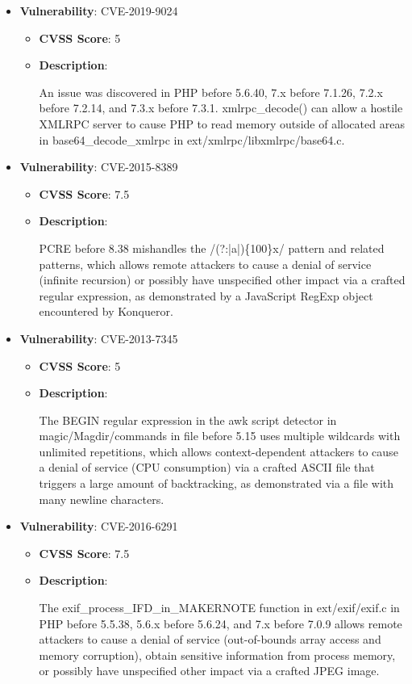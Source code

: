 \documentclass{article}
\begin{document}
\begin{itemize}
        \item \textbf{Vulnerability}: CVE-2019-9024
        \begin{itemize}
            \item \textbf{CVSS Score}:  5 
            \item \textbf{Description}:
            \parbox[t]{0.9\linewidth}{
                \ttfamily An issue was discovered in PHP before 5.6.40, 7.x before 7.1.26, 7.2.x before 7.2.14, and 7.3.x before 7.3.1. xmlrpc\_decode() can allow a hostile XMLRPC server to cause PHP to read memory outside of allocated areas in base64\_decode\_xmlrpc in ext/xmlrpc/libxmlrpc/base64.c.
            }
        \end{itemize}
    
        \item \textbf{Vulnerability}: CVE-2015-8389
        \begin{itemize}
            \item \textbf{CVSS Score}:  7.5 
            \item \textbf{Description}:
            \parbox[t]{0.9\linewidth}{
                \ttfamily PCRE before 8.38 mishandles the /(?:|a|)\{100\}x/ pattern and related patterns, which allows remote attackers to cause a denial of service (infinite recursion) or possibly have unspecified other impact via a crafted regular expression, as demonstrated by a JavaScript RegExp object encountered by Konqueror.
            }
        \end{itemize}
    
        \item \textbf{Vulnerability}: CVE-2013-7345
        \begin{itemize}
            \item \textbf{CVSS Score}:  5 
            \item \textbf{Description}:
            \parbox[t]{0.9\linewidth}{
                \ttfamily The BEGIN regular expression in the awk script detector in magic/Magdir/commands in file before 5.15 uses multiple wildcards with unlimited repetitions, which allows context-dependent attackers to cause a denial of service (CPU consumption) via a crafted ASCII file that triggers a large amount of backtracking, as demonstrated via a file with many newline characters.
            }
        \end{itemize}
    
        \item \textbf{Vulnerability}: CVE-2016-6291
        \begin{itemize}
            \item \textbf{CVSS Score}:  7.5 
            \item \textbf{Description}:
            \parbox[t]{0.9\linewidth}{
                \ttfamily The exif\_process\_IFD\_in\_MAKERNOTE function in ext/exif/exif.c in PHP before 5.5.38, 5.6.x before 5.6.24, and 7.x before 7.0.9 allows remote attackers to cause a denial of service (out-of-bounds array access and memory corruption), obtain sensitive information from process memory, or possibly have unspecified other impact via a crafted JPEG image.
            }
        \end{itemize}
    

\end{itemize}
\end{document}
